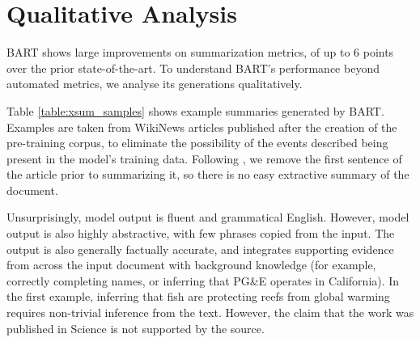\documentclass{article} %
\newcommand{\omer}[1]{{\color{blue} [Omer: #1]}}
\begin{document}
 

 


\section{Qualitative Analysis}
\label{section:qualitative}






BART shows large improvements on summarization metrics, of up to 6 points over the prior state-of-the-art. To understand BART's performance beyond automated metrics, we analyse its generations qualitatively.

Table \ref{table:xsum_samples} shows example summaries generated by BART. Examples are taken from WikiNews articles published after the creation of the pre-training corpus, to eliminate the possibility of the events described being present in the model's training data. Following \citet{xsum}, we remove the first sentence of the article prior to summarizing it, so there is no easy extractive summary of the document. 

Unsurprisingly, model output is fluent and grammatical English. However, model output is also highly abstractive, with few phrases copied from the input. The output is also generally factually accurate, and integrates supporting evidence from across the input document with background knowledge (for example, correctly completing names, or inferring that PG\&E operates in California). In the first example, inferring that fish are protecting reefs from global warming requires non-trivial inference from the text. However, the claim that the work was published in Science is not supported by the source. 
\end{document}
